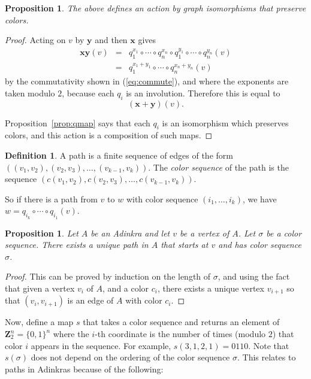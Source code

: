 \documentclass[12pt,twoside,singlespace]{article}
\numberwithin{equation}{section}
\newtheorem{prop}[equation]{Proposition}
\theoremstyle{definition}
\newtheorem{definition}[equation]{Definition}
\newcommand{\ZZ}{\mathbf{Z}}
\renewcommand{\vec}[1]{\mathbf{#1}}
\begin{document}
\begin{prop}
\label{prop:actioniso}
The above defines an action by graph isomorphisms that preserve colors.
\end{prop}
\begin{proof}
Acting on $v$ by $\vec{y}$ and then $\vec{x}$ gives
\begin{eqnarray*}
\vec{x}\vec{y}(v)
&=&q_1^{x_1}\circ\cdots\circ q_n^{x_n}\circ
q_1^{y_1}\circ\cdots\circ q_n^{y_n}(v)\\
&=&q_1^{x_1+y_1}\circ\cdots\circ q_n^{x_n+y_n}(v)
\end{eqnarray*}
by the commutativity shown in (\ref{eq:commute}), and where the exponents are taken modulo $2$, because each $q_i$ is an involution.  Therefore this is equal to
\[(\vec{x}+\vec{y})(v).\]

Proposition~\ref{prop:qmap} says that each $q_i$ is an isomorphism which preserves colors, and this action is a composition of such maps.
\end{proof}

\begin{definition}
A path is a finite sequence of edges of the form $((v_1,v_2),(v_2,v_3),\ldots,(v_{k-1},v_k))$.  The {\em color sequence} of the path is the sequence $(c(v_1,v_2),c(v_2,v_3),\ldots,c(v_{k-1},v_k))$.
\end{definition}

So if there is a path from $v$ to $w$ with color sequence $(i_1, \ldots, i_k)$, we have $w=q_{i_k}\circ \cdots\circ q_{i_1}(v)$.

\begin{prop}
\label{prop:colorpath}
Let $A$ be an Adinkra and let $v$ be a vertex of $A$.  Let $\sigma$ be a color sequence.  There exists a unique path in $A$ that starts at $v$ and has color sequence $\sigma$.
\end{prop}
\begin{proof}
This can be proved by induction on the length of $\sigma$, and using the fact that given a vertex $v_i$ of $A$, and a color $c_i$, there exists a unique vertex $v_{i+1}$ so that $(v_i,v_{i+1})$ is an edge of $A$ with color $c_i$.
\end{proof}

Now, define a map $s$ that takes a color sequence and returns an element of $\ZZ_2^n=\{0,1\}^n$ where the $i$-th coordinate is the number of times (modulo $2$) that color $i$ appears in the sequence. For example, $s(3,1,2,1) = 0110$.  Note that $s(\sigma)$ does not depend on the ordering of the color sequence $\sigma$.  This relates to paths in Adinkras because of the following:
\end{document}
